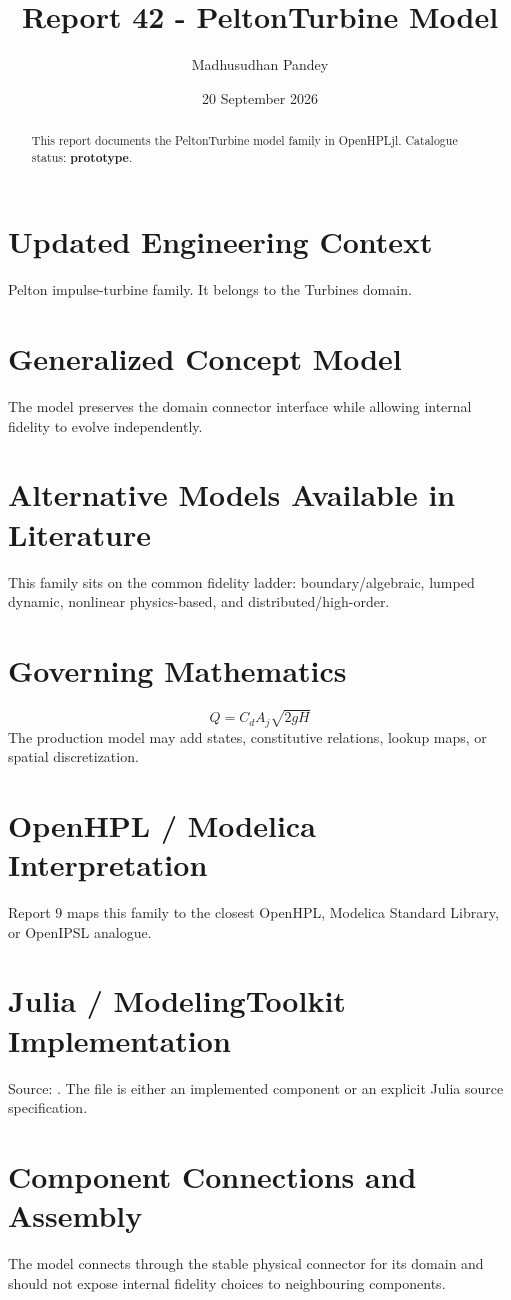\documentclass[10pt,a4paper]{article}
\title{Report 42 - PeltonTurbine Model}
\author{Madhusudhan Pandey}
\date{20 September 2026}
\begin{document}
\maketitle
\begin{abstract}This report documents the PeltonTurbine model family in OpenHPLjl. Catalogue status: \textbf{prototype}.\end{abstract}
\section{Updated Engineering Context}Pelton impulse-turbine family. It belongs to the Turbines domain.
\section{Generalized Concept Model}The model preserves the domain connector interface while allowing internal fidelity to evolve independently.
\section{Alternative Models Available in Literature}This family sits on the common fidelity ladder: boundary/algebraic, lumped dynamic, nonlinear physics-based, and distributed/high-order.
\section{Governing Mathematics}\[Q=C_d A_j\sqrt{2gH}\]The production model may add states, constitutive relations, lookup maps, or spatial discretization.
\section{OpenHPL / Modelica Interpretation}Report 9 maps this family to the closest OpenHPL, Modelica Standard Library, or OpenIPSL analogue.
\section{Julia / ModelingToolkit Implementation}Source: \texttt{}. The file is either an implemented component or an explicit Julia source specification.
\section{Component Connections and Assembly}The model connects through the stable physical connector for its domain and should not expose internal fidelity choices to neighbouring components.
\end{document}
